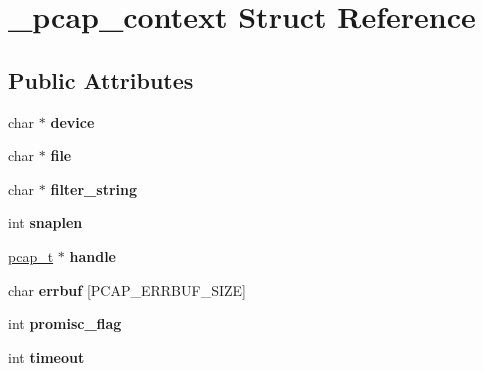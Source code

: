 \hypertarget{struct__pcap__context}{
\section{\_\-pcap\_\-context Struct Reference}
\label{struct__pcap__context}
}
\subsection*{Public Attributes}
\begin{DoxyCompactItemize}
\item 
\hypertarget{struct__pcap__context_afbaf432cea12ce7edf9699bd49e252f4}{
char $\ast$ {\bfseries device}}
\label{struct__pcap__context_afbaf432cea12ce7edf9699bd49e252f4}

\item 
\hypertarget{struct__pcap__context_a57cf68f4702739dc021ca38f6a7bae82}{
char $\ast$ {\bfseries file}}
\label{struct__pcap__context_a57cf68f4702739dc021ca38f6a7bae82}

\item 
\hypertarget{struct__pcap__context_a663e96cec77a25f2e196e6087601c66a}{
char $\ast$ {\bfseries filter\_\-string}}
\label{struct__pcap__context_a663e96cec77a25f2e196e6087601c66a}

\item 
\hypertarget{struct__pcap__context_a16539e5a0b5b29f6e197fda60833af98}{
int {\bfseries snaplen}}
\label{struct__pcap__context_a16539e5a0b5b29f6e197fda60833af98}

\item 
\hypertarget{struct__pcap__context_aecf0f2c618a011dde29412d4730187b9}{
\hyperlink{structpcap}{pcap\_\-t} $\ast$ {\bfseries handle}}
\label{struct__pcap__context_aecf0f2c618a011dde29412d4730187b9}

\item 
\hypertarget{struct__pcap__context_a057c1d844c80071530aa931c2338569b}{
char {\bfseries errbuf} \mbox{[}PCAP\_\-ERRBUF\_\-SIZE\mbox{]}}
\label{struct__pcap__context_a057c1d844c80071530aa931c2338569b}

\item 
\hypertarget{struct__pcap__context_a7a02ec807bb8e3c4951b40bbd8cdd280}{
int {\bfseries promisc\_\-flag}}
\label{struct__pcap__context_a7a02ec807bb8e3c4951b40bbd8cdd280}

\item 
\hypertarget{struct__pcap__context_a006cf0596df833ec7ace4bfa210f01a5}{
int {\bfseries timeout}}
\label{struct__pcap__context_a006cf0596df833ec7ace4bfa210f01a5}


\end{DoxyCompactItemize}
